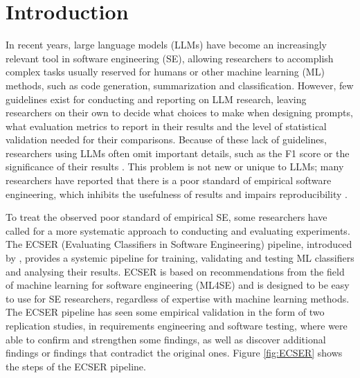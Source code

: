 \documentclass[a4paper]{article}
\begin{document}
\newpage
\tableofcontents

\newpage

\section{Introduction}
In recent years, large language models (LLMs) have become an increasingly relevant tool in software engineering (SE), allowing researchers to accomplish complex tasks usually reserved for humans or other machine learning (ML) methods, such as code generation, summarization and classification. However, few guidelines exist for conducting and reporting on LLM research, leaving researchers on their own to decide what choices to make when designing prompts, what evaluation metrics to report in their results and the level of statistical validation needed for their comparisons. Because of these lack of guidelines, researchers using LLMs often omit important details, such as the F1 score or the significance of their results \cite{guo2023survey}. This problem is not new or unique to LLMs; many researchers have reported that there is a poor standard of empirical software engineering, which inhibits the usefulness of results and impairs reproducibility \cite{kitchenham2002,Menzies2012}.

To treat the observed poor standard of empirical SE, some researchers have called for a more systematic approach to conducting and evaluating experiments. The ECSER (Evaluating Classifiers in Software Engineering) pipeline, introduced by \textcite{Dellanna2022}, provides a systemic pipeline for training, validating and testing ML classifiers and analysing their results. ECSER is based on recommendations from the field of machine learning for software engineering (ML4SE) and is designed to be easy to use for SE researchers, regardless of expertise with machine learning methods. The ECSER pipeline has seen some empirical validation in the form of two replication studies, in requirements engineering and software testing, where \citeauthor{Dellanna2022} were able to confirm and strengthen some findings, as well as discover additional findings or findings that contradict the original ones. Figure \ref{fig:ECSER} shows the steps of the ECSER pipeline.
\end{document}
